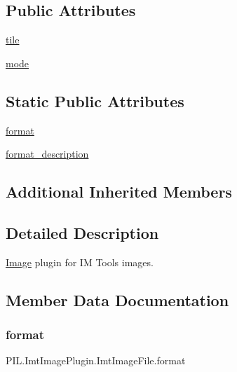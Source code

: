 \subsection*{Public Attributes}
\begin{DoxyCompactItemize}
\item 
\hyperlink{classPIL_1_1ImtImagePlugin_1_1ImtImageFile_ad9ee7c3045637077077f5ba75e3e573c}{tile}
\item 
\hyperlink{classPIL_1_1ImtImagePlugin_1_1ImtImageFile_afd9518341ad89cbd46ff939c84279b60}{mode}
\end{DoxyCompactItemize}
\subsection*{Static Public Attributes}
\begin{DoxyCompactItemize}
\item 
\hyperlink{classPIL_1_1ImtImagePlugin_1_1ImtImageFile_ac9e9bb4ff480854f2a79cfcbcc90c619}{format}
\item 
\hyperlink{classPIL_1_1ImtImagePlugin_1_1ImtImageFile_a25b114a1ddb71f83962616a38aa49929}{format\+\_\+description}
\end{DoxyCompactItemize}
\subsection*{Additional Inherited Members}


\subsection{Detailed Description}
\hyperlink{namespacePIL_1_1Image}{Image} plugin for IM Tools images. 



\subsection{Member Data Documentation}
\mbox{\label{classPIL_1_1ImtImagePlugin_1_1ImtImageFile_ac9e9bb4ff480854f2a79cfcbcc90c619}} 
\subsubsection{\texorpdfstring{format}{format}}
{\footnotesize\ttfamily P\+I\+L.\+Imt\+Image\+Plugin.\+Imt\+Image\+File.\+format\hspace{0.3cm}{\ttfamily [static]}}

